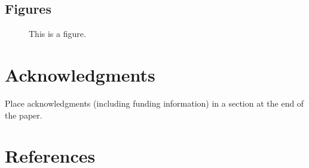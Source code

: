 \documentclass[10pt,letterpaper]{article}
\begin{document}
\subsection{Figures}

\begin{figure}[ht]
\begin{center}
\end{center}
\caption{This is a figure.} 
\label{sample-figure}
\end{figure}


\section{Acknowledgments}

Place acknowledgments (including funding information) in a section at
the end of the paper.


\section{References}




\setlength{\bibleftmargin}{.125in}
\setlength{\bibindent}{-\bibleftmargin}


\end{document}
